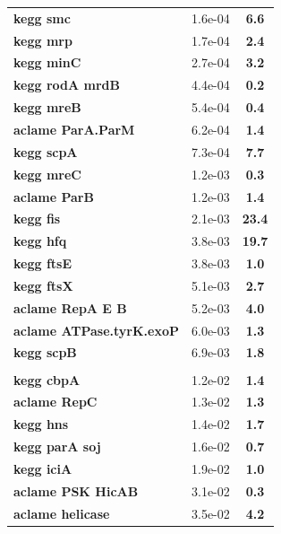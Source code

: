 \begin{landscape}
\begin{table}
{\begin{minipage}[t]{0.3\textwidth}
\begin{tabular}{>{\bfseries}p{\textwidth}cc}
\rowcolor{posit}kegg smc&1.6e-04&\textbf{\colorbox{colorpowerx}{6.6}}\\
\rowcolor{posit}kegg mrp&1.7e-04&\textbf{\colorbox{colorpower}{2.4}}\\
\rowcolor{posit}kegg minC&2.7e-04&\textbf{\colorbox{colorpowerx}{3.2}}\\
\rowcolor{posit}kegg rodA mrdB&4.4e-04&\textbf{\colorbox{colorpowernegx}{0.2}}\\
\rowcolor{posit}kegg mreB&5.4e-04&\textbf{\colorbox{colorpowerneg}{0.4}}\\
\rowcolor{posit}aclame ParA.ParM&6.2e-04&\textbf{\colorbox{colorpower}{1.4}}\\
\rowcolor{posit}kegg scpA&7.3e-04&\textbf{\colorbox{colorpowerxx}{7.7}}\\
\rowcolor{posit}kegg mreC&1.2e-03&\textbf{\colorbox{colorpowernegx}{0.3}}\\
\rowcolor{posit}aclame ParB&1.2e-03&\textbf{\colorbox{colorpower}{1.4}}\\
\rowcolor{posit}kegg fis&2.1e-03&\textbf{\colorbox{colorpowerxxx}{23.4}}\\
\rowcolor{posit}kegg hfq&3.8e-03&\textbf{\colorbox{colorpowerxx}{19.7}}\\
\rowcolor{posit}kegg ftsE&3.8e-03&\textbf{\colorbox{colorpower}{1.0}}\\
\rowcolor{posit}kegg ftsX&5.1e-03&\textbf{\colorbox{colorpower}{2.7}}\\
\rowcolor{posit}aclame RepA E B&5.2e-03&\textbf{\colorbox{colorpowerx}{4.0}}\\
\rowcolor{posit}aclame ATPase.tyrK.exoP&6.0e-03&\textbf{\colorbox{colorpower}{1.3}}\\
\rowcolor{posit}kegg scpB&6.9e-03&\textbf{\colorbox{colorpower}{1.8}}\\
\\
\rowcolor{posit2}kegg cbpA&1.2e-02&\textbf{\colorbox{colorpower}{1.4}}\\
\rowcolor{posit2}aclame RepC&1.3e-02&\textbf{\colorbox{colorpower}{1.3}}\\
\rowcolor{posit2}kegg hns&1.4e-02&\textbf{\colorbox{colorpower}{1.7}}\\
\rowcolor{posit2}kegg parA soj&1.6e-02&\textbf{\colorbox{colorpowerneg}{0.7}}\\
\rowcolor{posit2}kegg iciA&1.9e-02&\textbf{\colorbox{colorpower}{1.0}}\\
\rowcolor{posit2}aclame PSK HicAB&3.1e-02&\textbf{\colorbox{colorpowernegx}{0.3}}\\
\rowcolor{posit2}aclame helicase&3.5e-02&\textbf{\colorbox{colorpowerx}{4.2}}\\

\end{tabular}
\end{minipage}}
\end{table}
\end{landscape}
